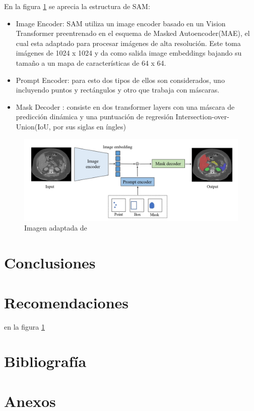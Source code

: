 \documentclass[12pt]{article}
\begin{document}
		En la figura \ref{fig:fig1} se aprecia la estructura de SAM:
		\begin{itemize}
			\item[1] Image Encoder: SAM utiliza un image encoder basado en un Vision Transformer  preentrenado en el esquema de Masked Autoencoder(MAE), el cual esta adaptado para procesar im\'agenes de alta resoluci\'on. Este toma im\'agenes de 1024 x 1024 y da como salida image embeddings bajando su tama\~no a un mapa de caracter\'isticas de 64 x 64.
			\item[2] Prompt Encoder: para esto dos tipos de ellos son considerados, uno incluyendo puntos y rect\'angulos y otro que trabaja con m\'ascaras.
			
			\item[3] Mask Decoder : consiste en dos transformer layers con una m\'ascara de predicci\'on din\'amica y  una puntuaci\'on de regresi\'on Intersection-over-Union(IoU, por sus siglas en \'ingles)
		\end{itemize}
		
		\begin{figure}[h] 
			\centering
			\caption{ Imagen adaptada de}
			\includegraphics[width=1\textwidth]{1.jpeg}
			
			\label{fig:fig1}
			
			
		\end{figure}
	
	\newpage
	
	\section{Conclusiones}
	\newpage
	
	\section{Recomendaciones}
	en la figura \ref{fig:fig1}
	\newpage
	
	\section{Bibliograf\'ia}
	\printbibliography[title={" "}]
	\newpage
	
	\section{Anexos}
	
	
\end{document}
